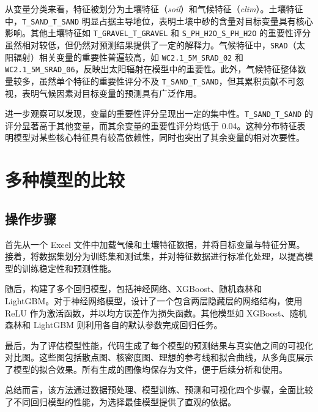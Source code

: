 \documentclass[AutoFakeBold]{LZUThesis-PgD&PhD}
\begin{document}
从变量分类来看，特征被划分为土壤特征（\textit{soil}）和气候特征（\textit{clim}）。土壤特征中，\texttt{T\_SAND\_T\_SAND} 明显占据主导地位，表明土壤中砂的含量对目标变量具有核心影响。其他土壤特征如 \texttt{T\_GRAVEL\_T\_GRAVEL} 和 \texttt{S\_PH\_H2O\_S\_PH\_H2O} 的重要性评分虽然相对较低，但仍然对预测结果提供了一定的解释力。气候特征中，\texttt{SRAD}（太阳辐射）相关变量的重要性普遍较高，如 \texttt{WC2.1\_5M\_SRAD\_02} 和 \texttt{WC2.1\_5M\_SRAD\_06}，反映出太阳辐射在模型中的重要性。此外，气候特征整体数量较多，虽然单个特征的重要性评分不及 \texttt{T\_SAND\_T\_SAND}，但其累积贡献不可忽视，表明气候因素对目标变量的预测具有广泛作用。

进一步观察可以发现，变量的重要性评分呈现出一定的集中性。\texttt{T\_SAND\_T\_SAND} 的评分显著高于其他变量，而其余变量的重要性评分均低于 0.04。这种分布特征表明模型对某些核心特征具有较高依赖性，同时也突出了其余变量的相对次要性。

	\section{多种模型的比较}
	            
	\subsection{操作步骤}

	
	首先从一个 Excel 文件中加载气候和土壤特征数据，并将目标变量与特征分离。接着，将数据集划分为训练集和测试集，并对特征数据进行标准化处理，以提高模型的训练稳定性和预测性能。
	
	随后，构建了多个回归模型，包括神经网络、XGBoost、随机森林和 LightGBM。对于神经网络模型，设计了一个包含两层隐藏层的网络结构，使用 ReLU 作为激活函数，并以均方误差作为损失函数。其他模型如 XGBoost、随机森林和 LightGBM 则利用各自的默认参数完成回归任务。
	
	最后，为了评估模型性能，代码生成了每个模型的预测结果与真实值之间的可视化对比图。这些图包括散点图、核密度图、理想的参考线和拟合曲线，从多角度展示了模型的拟合效果。所有生成的图像均保存为文件，便于后续分析和使用。
	
	总结而言，该方法通过数据预处理、模型训练、预测和可视化四个步骤，全面比较了不同回归模型的性能，为选择最佳模型提供了直观的依据。
	
	
	
\end{document}
